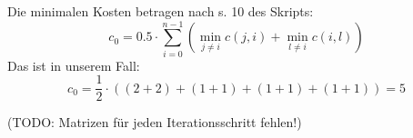 \documentclass[10pt,a4paper]{article}
\begin{document}
\begin{enumerate}[label={\alph*)}]
\begin{figure}[H]
            \end{figure}
            Die minimalen Kosten betragen nach s. 10 des Skripts:
            $$
                c_0 = 0.5 \cdot \sum_{i=0}^{n-1}
                \left( \min\limits_{j \neq i} c(j,i) +
                \min\limits_{l \neq i} c(i,l) \right)
            $$
            Das ist in unserem Fall:
            $$
                c_0 = \frac{1}{2} \cdot
                    ((2+2)+(1+1)+(1+1)+(1+1))
                    = 5
            $$
            \begin{figure}[H]
                \centering
                \def\svgwidth{\columnwidth}
            \end{figure}
            (TODO: Matrizen f\"ur jeden Iterationsschritt fehlen!)

    \end{enumerate}
\end{document}
